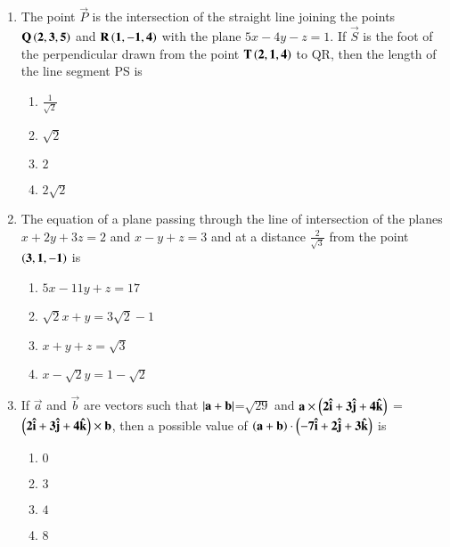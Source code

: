 \documentclass[journal,12pt,twocolumn]{IEEEtran}
\theoremstyle{remark}
\begin{document}
\begin{enumerate}
	 \item %
		 The point $\vec{P}$ is the intersection of the straight line joining the points $\mathbf{Q\left(2,3,5\right)}$ and $\mathbf{R\left(1,-1,4\right)}$ with the plane $5x-4y-z=1$. If $\vec{S}$ is the foot of the perpendicular drawn from the point $\mathbf{T\left(2,1,4\right)}$ to QR, then the length of the line segment PS is \hfill{}\\
\begin{enumerate}
	\item $\frac{1}{\sqrt{2}}$           
	\item $\sqrt{2}$                   
        \item $2$           
	\item $2\sqrt{2}$\\ 
\end{enumerate}
\newpage
         \item %
		 The equation of a plane passing through the line of intersection of the planes $x+2y+3z=2$ and $x-y+z=3$ and at a distance $\frac{2}{\sqrt{3}}$ from the point $\mathbf{\left(3,1,-1\right)}$ is \hfill{}\\
\begin{enumerate}
        \item $5x-11y+z=17$           
	\item $\sqrt{2}x+y=3\sqrt{2}-1$                   
	\item $x+y+z=\sqrt{3}$           
	\item $x-\sqrt{2}y=1-\sqrt{2}$\\ 
\end{enumerate}

         \item %
		 If $\vec{a}$ and $\vec{b}$ are vectors such that $\left\vert\mathbf{a}+\mathbf{b}\right\vert$=$\sqrt{29}$ and $\mathbf{a\times\left(2\hat{i}+3\hat{j}+4\hat{k}\right)}$ = $\mathbf{\left(2\hat{i}+3\hat{j}+4\hat{k}\right)}\times\mathbf{b}$, then a possible value of $\left(\mathbf{a}+\mathbf{b}\right)\cdot\mathbf{\left(-7\hat{i}+2\hat{j}+3\hat{k}\right)}$ is \hfill{}\\
\begin{enumerate}
        \item $0$                             
        \item $3$                           
        \item $4$            
        \item $8$\\          
\end{enumerate}


\end{enumerate}
\end{document}
